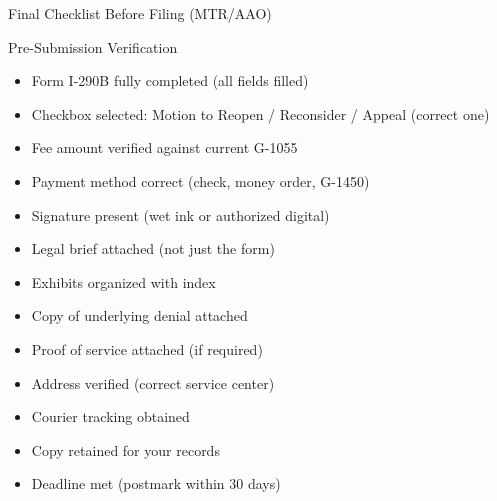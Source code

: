 \documentclass[11pt]{beamer}
\begin{document}
	
	\begin{frame}{Final Checklist Before Filing (MTR/AAO)}
		\scriptsize
		\begin{block}{Pre-Submission Verification}
			\begin{itemize}
				\item [$\square$] Form I-290B fully completed (all fields filled)
				\item [$\square$] Checkbox selected: Motion to Reopen / Reconsider / Appeal (correct one)
				\item [$\square$] Fee amount verified against current G-1055
				\item [$\square$] Payment method correct (check, money order, G-1450)
				\item [$\square$] Signature present (wet ink or authorized digital)
				\item [$\square$] Legal brief attached (not just the form)
				\item [$\square$] Exhibits organized with index
				\item [$\square$] Copy of underlying denial attached
				\item [$\square$] Proof of service attached (if required)
				\item [$\square$] Address verified (correct service center)
				\item [$\square$] Courier tracking obtained
				\item [$\square$] Copy retained for your records
				\item [$\square$] Deadline met (postmark within 30 days)
			\end{itemize}
		\end{block}
	\end{frame}
	
\end{document}
